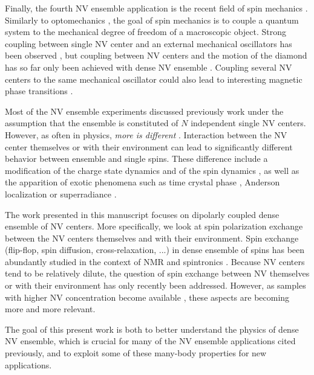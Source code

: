 \documentclass[a4paper, 11pt]{report}
\begin{document}
Finally, the fourth NV ensemble application is the recent field of spin mechanics \citep{perdriat2021spin}. Similarly to optomechanics \citep{aspelmeyer2014cavity}, the goal of spin mechanics is to couple a quantum system to the mechanical degree of freedom of a macroscopic object. Strong coupling between single NV center and an external mechanical oscillators has been observed \citep{rabl2009strong, kolkowitz2012coherent}, but coupling between NV centers and the motion of the diamond has so far only been achieved with dense NV ensemble \citep{delord2020spin, pellet2021magnetic, perdriat2022angle}. Coupling several NV centers to the same mechanical oscillator could also lead to interesting magnetic phase transitions \citep{wei2015magnetic, ma2017proposal}.

Most of the NV ensemble experiments discussed previously work under the assumption that the ensemble is constituted of $N$ independent single NV centers. However, as often in physics, \textit{more is different} \citep{anderson1972more}. Interaction between the NV center themselves or with their environment can lead to significantly different behavior between ensemble and single spins. These difference include a modification of the charge state dynamics \citep{giri2018coupled} and of the spin dynamics \citep{dobrovitski2008decoherence, jarmola2012temperature, mrozek2015longitudinal, choi2017depolarization}, as well as the apparition of exotic phenomena such as time crystal phase \citep{choi2017observation}, Anderson localization \citep{kucsko2018critical} or superradiance \citep{bradac2017room, angerer2018superradiant}. 

The work presented in this manuscript focuses on dipolarly coupled dense ensemble of NV centers. More specifically, we look at spin polarization exchange between the NV centers themselves and with their environment. Spin exchange (flip-flop, spin diffusion, cross-relaxation, ...) in dense ensemble of spins has been abundantly studied in the context of NMR \citep{abragam1978principles} and spintronics \citep{vzutic2004spintronics}. Because NV centers tend to be relatively dilute, the question of spin exchange between NV themselves \citep{choi2017depolarization} or with their environment \citep{hall2016detection} has only recently been addressed. However, as samples with higher NV concentration become available \citep{acosta2009diamonds, tallaire2020high, shenderova2019synthesis}, these aspects are becoming more and more relevant.

The goal of this present work is both to better understand the physics of dense NV ensemble, which is crucial for many of the NV ensemble applications cited previously, and to exploit some of these many-body properties for new applications.
\end{document}
